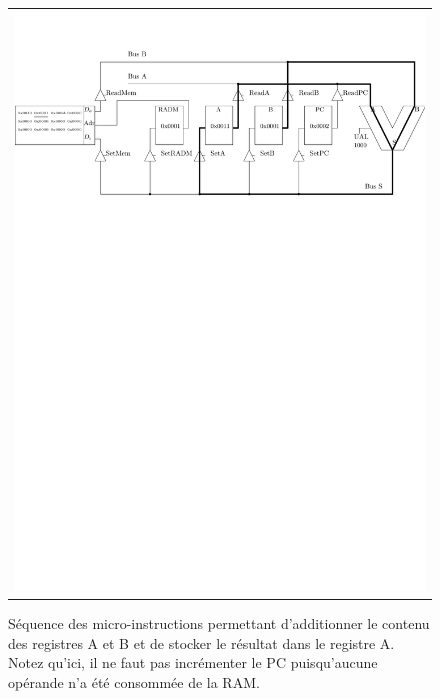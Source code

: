 \begin{figure}[htbp]
\begin{tabular}{c}
\includegraphics[width=\linewidth]{Figs/premier_chemin_adda.pdf}
\end{tabular}
\caption{\label{fig:premier_chemin_adda} Séquence des micro-instructions permettant d'additionner le contenu des registres A et B et de stocker le résultat dans le registre A. Notez qu'ici, il ne faut pas incrémenter le PC puisqu'aucune opérande n'a été consommée de la RAM.}
\end{figure}

